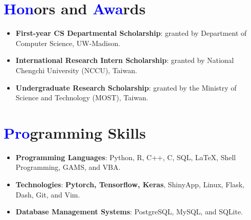\documentclass[letterpaper,11pt]{article}
\newcommand{\resumeItem}[2]{
  \item\small{
    \textbf{#1}{: #2 \vspace{-2pt}}
  }
}
\newcommand{\resumeSubItem}[2]{\resumeItem{#1}{#2}\vspace{-5pt}}
\newcommand{\resumeSubHeadingListStart}{\begin{itemize}[leftmargin=*]}
\newcommand{\resumeSubHeadingListEnd}{\end{itemize}}
\begin{document}
\section{\textbf{\textcolor{blue}{Hon}ors and \textcolor{blue}{Awa}rds}}
  \resumeSubHeadingListStart
    \resumeSubItem{First-year CS Departmental Scholarship}{granted by Department of Computer Science, UW-Madison.}
    \resumeSubItem{International Research Intern Scholarship}{granted by National Chengchi University (NCCU), Taiwan.}
    \resumeSubItem{Undergraduate Research Scholarship}{granted by the Ministry of Science and Technology (MOST), Taiwan.}
  \resumeSubHeadingListEnd

\section{\textbf{\textcolor{blue}{Pro}gramming Skills}}
  \resumeSubHeadingListStart
  \item{
    \textbf{Programming Languages}{: Python, R, C++, C, SQL, LaTeX, Shell Programming, GAMS, and VBA.}
  }
  \vspace{-6pt}
  \item{
          \textbf{Technologies}{: \textbf{Pytorch, Tensorflow, Keras}, ShinyApp, Linux, Flask, Dash, Git, and Vim.}
  }
  \vspace{-6pt}
  \item{
    \textbf{Database Management Systems}{: PostgreSQL, MySQL, and SQLite.}
  }
  \resumeSubHeadingListEnd
\end{document}
